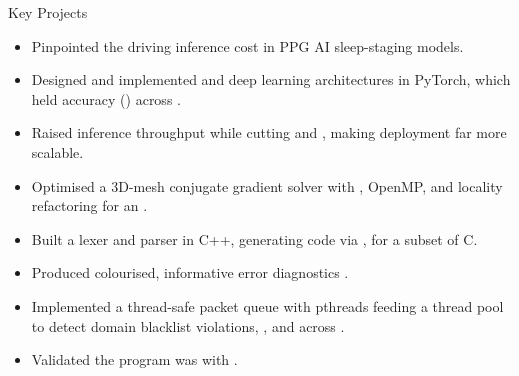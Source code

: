 \documentclass{cv}
\begin{document}
\begin{experienceSection}{Key Projects}
    \lrTitle[
        ltitle={Deep Learning for Efficient Sleep Staging with PPG Data},
        rtitle={(Python, PyTorch, Deep Learning, Time-Series)}
    ]
    \begin{itemize}
        \item Pinpointed the  driving inference cost in  PPG AI sleep-staging models.
        \item Designed and implemented  and  deep learning architectures in PyTorch, which held accuracy () across .
        \item Raised inference throughput  while cutting  and , making deployment far more scalable.
    \end{itemize}

    \lrTitle[
        ltitle={Conjugate Gradient Optimisation on a 3D Mesh},
        rtitle={(C, AVX-256, OpenMP, Cache Optimisation)}
    ]
    \begin{itemize}
        \item Optimised a 3D-mesh conjugate gradient solver with , OpenMP, and locality refactoring for an .
    \end{itemize}

    \lrTitle[
        ltitle={Mini C Compiler},
        rtitle={(C++, LLVM, Compilers)}
    ]
    \begin{itemize}
        \item Built a  lexer and parser in C++, generating code via , for a subset of C.
        \item Produced colourised, informative error diagnostics .
    \end{itemize}

    \lrTitle[
        ltitle={Multithreaded Packet Sniffer},
        rtitle={(C, Networking, Multithreading)},
    ]
    \begin{itemize}
        \item Implemented a thread-safe packet queue with pthreads feeding a thread pool to detect domain blacklist violations, , and  across .
        \item Validated the program was  with .
    \end{itemize}


\end{experienceSection}
\end{document}
